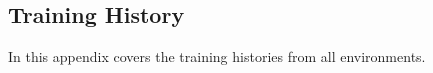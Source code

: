 \documentclass[12pt,A4]{report}
\theoremstyle{definition}
\begin{document}







\begin{appendices}
\chapter{Training History}

In this appendix covers the training histories from all environments. 


\end{appendices}
\end{document}
